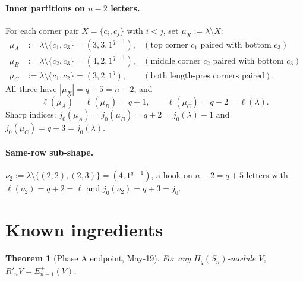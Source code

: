 \documentclass[11pt]{article}
\newtheorem{theorem}{Theorem}
\theoremstyle{definition}
\begin{document}
\paragraph{Inner partitions on $n - 2$ letters.}
For each corner pair $X = \{c_i, c_j\}$ with $i < j$, set
$\mu_X := \lambda \setminus X$:
\begin{align*}
   \mu_A &:= \lambda \setminus \{c_1, c_3\} = (3, 3, 1^{q-1}),
      &(\text{top corner $c_1$ paired with bottom $c_3$}) \\
   \mu_B &:= \lambda \setminus \{c_2, c_3\} = (4, 2, 1^{q-1}),
      &(\text{middle corner $c_2$ paired with bottom $c_3$}) \\
   \mu_C &:= \lambda \setminus \{c_1, c_2\} = (3, 2, 1^q),
      &(\text{both length-pres corners paired}).
\end{align*}
All three have $|\mu_X| = q + 5 = n - 2$, and
\[
   \ell(\mu_A) = \ell(\mu_B) = q + 1,
   \qquad
   \ell(\mu_C) = q + 2 = \ell(\lambda).
\]
Sharp indices: $j_0(\mu_A) = j_0(\mu_B) = q + 2 = j_0(\lambda) - 1$
and $j_0(\mu_C) = q + 3 = j_0(\lambda)$.

\paragraph{Same-row sub-shape.}
$\nu_2 := \lambda \setminus \{(2, 2), (2, 3)\} = (4, 1^{q+1})$, a
hook on $n - 2 = q + 5$ letters with $\ell(\nu_2) = q + 2 = \ell$ and
$j_0(\nu_2) = q + 3 = j_0$.

\section{Known ingredients}\label{sec:ingredients}

\begin{theorem}[Phase A endpoint, May-19]\label{thm:phaseA}
For any $H_q(S_n)$-module $V$, $R'_n V = E_{n-1}^+(V)$.
\end{theorem}
\end{document}
